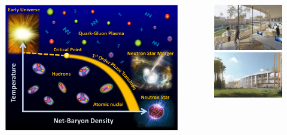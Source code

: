 \documentclass[dvipsnames] {beamer}
\begin{document}
\begin{frame}
\begin{columns}[t]
{\begin{block}{\bf {}}
      \includegraphics[width=1.\linewidth]{QCD_artisticView.png}
    \end{block}
    }
    \begin{block}{}
    \begin{figure}[H]
        \includegraphics[width=.5\linewidth]{NICA_innovCenter.png}
         \includegraphics[width=.5\linewidth]{NICA_innov2.png}
    \end{figure}

\end{block}
\end{columns}
\end{frame}
\end{document}
